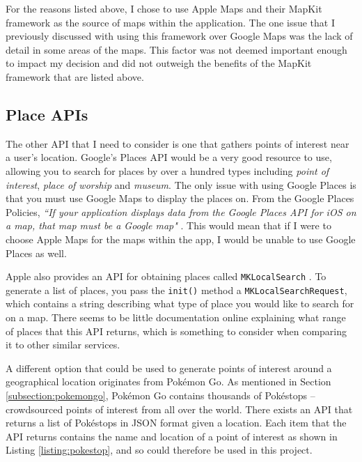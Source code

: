 For the reasons listed above, I chose to use Apple Maps and their MapKit framework as the source of maps within the application. The one issue that I previously discussed with using this framework over Google Maps was the lack of detail in some areas of the maps. This factor was not deemed important enough to impact my decision and did not outweigh the benefits of the MapKit framework that are listed above.

\subsection{Place APIs}

The other API that I need to consider is one that gathers points of interest near a user's location. Google's Places API \cite{GoogleInc.b} would be a very good resource to use, allowing you to search for places by over a hundred types including \textit{point of interest}, \textit{place of worship} and \textit{museum}. The only issue with using Google Places is that you must use Google Maps to display the places on. From the Google Places Policies, \textit{``If your application displays data from the Google Places API for iOS on a map, that map must be a Google map"} \cite{GoogleInc.c}. This would mean that if I were to choose Apple Maps for the maps within the app, I would be unable to use Google Places as well.

Apple also provides an API for obtaining places called \texttt{MKLocalSearch} \cite{AppleInc.b}. To generate a list of places, you pass the \texttt{init()} method a \texttt{MKLocalSearchRequest}, which contains a string describing what type of place you would like to search for on a map. There seems to be little documentation online explaining what range of places that this API returns, which is something to consider when comparing it to other similar services.

A different option that could be used to generate points of interest around a geographical location originates from Pok\'{e}mon Go. As mentioned in Section \ref{subsection:pokemongo}, Pok\'{e}mon Go contains thousands of Pok\'{e}stops -- crowdsourced points of interest from all over the world. There exists an API \cite{Selwyn} that returns a list of Pok\'{e}stops in JSON format given a location. Each item that the API returns contains the name and location of a point of interest as shown in Listing \ref{listing:pokestop}, and so could therefore be used in this project.

